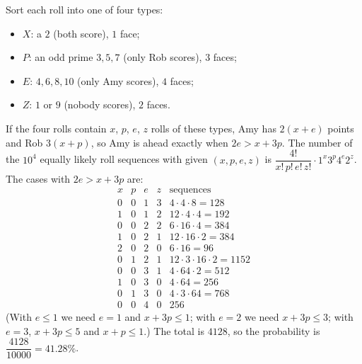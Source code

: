 Sort each roll into one of four types:
\begin{itemize}
\item $X$: a $2$ (both score), $1$ face;
\item $P$: an odd prime $3,5,7$ (only Rob scores), $3$ faces;
\item $E$: $4,6,8,10$ (only Amy scores), $4$ faces;
\item $Z$: $1$ or $9$ (nobody scores), $2$ faces.
\end{itemize}
If the four rolls contain $x$, $p$, $e$, $z$ rolls of these types, Amy has $2(x+e)$ points and Rob $3(x+p)$, so Amy is ahead exactly when $2e>x+3p$. The number of the $10^4$ equally likely roll sequences with given $(x,p,e,z)$ is $\dfrac{4!}{x!\,p!\,e!\,z!}\cdot1^x3^p4^e2^z$. The cases with $2e>x+3p$ are:
\[\begin{array}{cccc|c}
x&p&e&z&\text{sequences}\\\hline
0&0&1&3&4\cdot4\cdot8=128\\
1&0&1&2&12\cdot4\cdot4=192\\
0&0&2&2&6\cdot16\cdot4=384\\
1&0&2&1&12\cdot16\cdot2=384\\
2&0&2&0&6\cdot16=96\\
0&1&2&1&12\cdot3\cdot16\cdot2=1152\\
0&0&3&1&4\cdot64\cdot2=512\\
1&0&3&0&4\cdot64=256\\
0&1&3&0&4\cdot3\cdot64=768\\
0&0&4&0&256
\end{array}\]
(With $e\le1$ we need $e=1$ and $x+3p\le1$; with $e=2$ we need $x+3p\le3$; with $e=3$, $x+3p\le5$ and $x+p\le1$.) The total is $4128$, so the probability is $\dfrac{4128}{10000}=\boxed{41.28\%}$.
